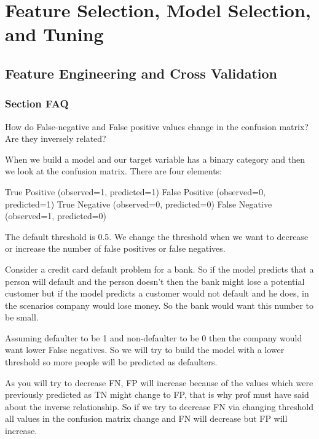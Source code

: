 	\chapter{Feature Selection, Model Selection, and Tuning}
	\section{Feature Engineering and Cross Validation}
	\subsection{Section FAQ}

	\resetquestioncounter{}
	\begin{qanda}
		\begin{question}
How do False-negative and False positive values change in the confusion matrix? Are they inversely related?
		\end{question}

		\begin{answer}
When we build a model and our target variable has a binary category and then we look at the confusion matrix. There are four elements:

		\begin{code}[\codenumbering]{}
			\codeitemnonumber True Positive (observed=1, predicted=1)
			\codeitemnonumber False Positive (observed=0, predicted=1)
			\codeitemnonumber True Negative (observed=0, predicted=0)
			\codeitemnonumber False Negative (observed=1, predicted=0)
		\end{code}

\vspace{\baselineskip}
The default threshold is 0.5. We change the threshold when we want to decrease or increase the number of false positives or false negatives.

\vspace{\baselineskip}
Consider a credit card default problem for a bank. So if the model predicts that a person will default and the person doesn't then the bank might lose a potential customer but if the model predicts a customer would not default and he does, in the scenarios company would lose money. So the bank would want this number to be small.

\vspace{\baselineskip}
Assuming defaulter to be 1 and non-defaulter to be 0 then the company would want lower False negatives. So we will try to build the model with a lower threshold so more people will be predicted as defaulters.

\vspace{\baselineskip}
As you will try to decrease FN, FP will increase because of the values which were previously predicted as TN might change to FP, that is why prof must have said about the inverse relationship. So if we try to decrease FN via changing threshold all values in the confusion matrix change and FN will decrease but FP will increase.
		\end{answer}
	\end{qanda}

